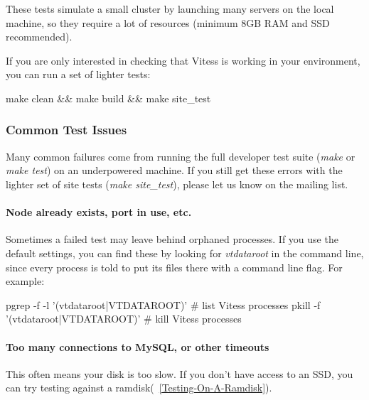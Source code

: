 These tests simulate a small cluster by launching many servers on the local
machine, so they require a lot of resources (minimum 8GB RAM and SSD recommended).

If you are only interested in checking that Vitess is working in your
environment, you can run a set of lighter tests:

\begin{codesample2}

  make clean && make build && make site_test

\end{codesample2}

\subsubsection{Common Test Issues}\hypertarget{common-test-issues}{}\label{common-test-issues}

Many common failures come from running the full developer test suite
(\emph{make} or \emph{make test}) on an underpowered machine. If you still get
these errors with the lighter set of site tests (\emph{make site\_test}),
please let us know on the mailing list.

\paragraph{Node already exists, port in use, etc.}\hypertarget{node-already-exists-port-in-use-etc}{}\label{node-already-exists-port-in-use-etc}

Sometimes a failed test may leave behind orphaned processes.
If you use the default settings, you can find these by looking for
\emph{vtdataroot} in the command line, since every process is told to put
its files there with a command line flag. For example:
\begin{codesample4}
    pgrep -f -l '(vtdataroot|VTDATAROOT)' # list Vitess processes
    pkill -f '(vtdataroot|VTDATAROOT)'    # kill Vitess processes
\end{codesample4}


\paragraph{Too many connections to MySQL, or other timeouts}\hypertarget{too-many-connections-to-mysql-or-other-timeouts}{}\label{too-many-connections-to-mysql-or-other-timeouts}

This often means your disk is too slow. If you don't have access to an SSD,
you can try testing against a ramdisk(~\ref{Testing-On-A-Ramdisk}).

